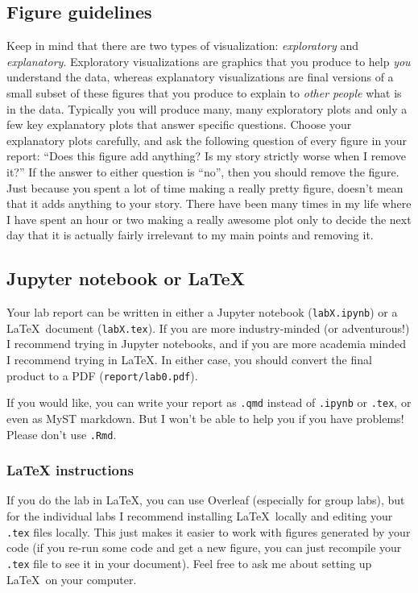 \documentclass[letterpaper,12pt]{article}
\begin{document}
\subsection{Figure guidelines}
Keep in mind that there are two types of visualization: \textit{exploratory} and \textit{explanatory}. Exploratory visualizations are graphics that you produce to help \textit{you} understand the data, whereas explanatory visualizations are final versions of a small subset of these figures that you produce to explain to \textit{other people} what is in the data. Typically you will produce many, many exploratory plots and only a few key explanatory plots that answer specific questions. Choose your explanatory plots carefully, and ask the following question of every figure in your report: ``Does this figure add anything? Is my story strictly worse when I remove it?'' If the answer to either question is ``no'', then you should remove the figure. Just because you spent a lot of time making a really pretty figure, doesn't mean that it adds anything to your story. There have been many times in my life where I have spent an hour or two making a really awesome plot only to decide the next day that it is actually fairly irrelevant to my main points and removing it.


\subsection{Jupyter notebook or LaTeX}

Your lab report can be written in either a Jupyter notebook (\texttt{labX.ipynb}) or a \LaTeX\ document (\texttt{labX.tex}). If you are more industry-minded (or adventurous!) I recommend trying in Jupyter notebooks, and if you are more academia minded I recommend trying in \LaTeX. In either case, you should convert the final product to a PDF (\texttt{report/lab0.pdf}).

If you would like, you can write your report as \texttt{.qmd} instead of \texttt{.ipynb} or \texttt{.tex}, or even as MyST markdown. But I won't be able to help you if you have problems! Please don't use \texttt{.Rmd}.

\subsubsection{LaTeX instructions}
If you do the lab in \LaTeX, you can use Overleaf (especially for group labs), but for the individual labs I recommend installing \LaTeX\ locally and editing your \texttt{.tex} files locally. This just makes it easier to work with figures generated by your code (if you re-run some code and get a new figure, you can just recompile your \texttt{.tex} file to see it in your document). Feel free to ask me about setting up \LaTeX\ on your computer.
\end{document}

